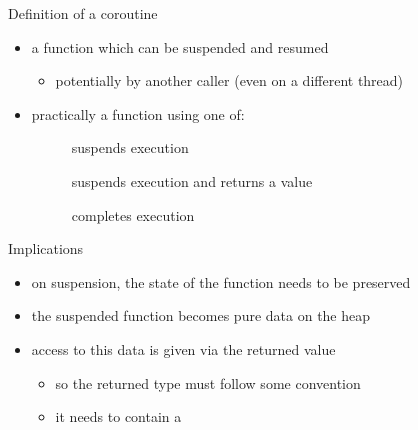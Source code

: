 \begin{frame}
  \begin{block}{Definition of a coroutine}
    \begin{itemize}
    \item a function which can be suspended and resumed
      \begin{itemize}
      \item potentially by another caller (even on a different thread)
      \end{itemize}
    \item practically a function using one of:
      \begin{description}
      \item[] suspends execution
      \item[] suspends execution and returns a value
      \item[] completes execution
      \end{description}
    \end{itemize}
  \end{block}
  \begin{alertblock}{Implications}
    \begin{itemize}
    \item on suspension, the state of the function needs to be preserved
    \item the suspended function becomes pure data on the heap
    \item access to this data is given via the returned value
      \begin{itemize}
      \item so the returned type must follow some convention
      \item it needs to contain a 
      \end{itemize}
    \end{itemize}
  \end{alertblock}
\end{frame}

